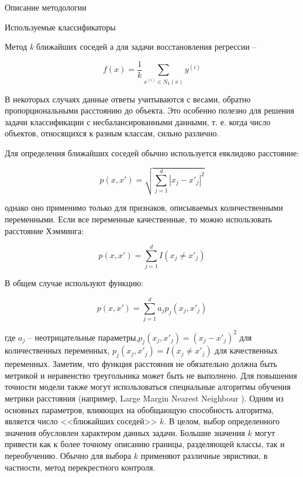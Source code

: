 \begin{section}{Описание методологии}
\begin{subsection}{Используемые классификаторы}
\begin{subsubsection}{Метод \textit{k} ближайших соседей}
      а для задачи восстановления регрессии –

      \begin{equation}
      f(x)=\frac{1}{k} \sum_{x^{(i)} \in N_k(x)}y^{(i)}
     \end{equation}

     В некоторых случаях данные ответы учитываются с весами, обратно пропорциональными расстоянию до объекта. Это особенно полезно для решения задачи классификации с несбалансированными данными, т. е. когда число объектов, относящихся к разным классам, сильно различно.

Для определения ближайших соседей обычно используется евклидово расстояние:

    \begin{equation}
      p(x,x') = \sqrt{\sum\limits_{j=1}^d |x_j - x'_j|^2}
    \end{equation}


    однако оно применимо только для признаков, описываемых количественными переменными. Если все переменные качественные, то можно использовать расстояние Хэмминга:

    \begin{equation}
      p(x,x') = \sum\limits_{j=1}^d I(x_j \neq x'_j)
    \end{equation}

    В общем случае используют функцию:

\begin{equation}
  p(x,x')=\sum\limits_{j=1}^d a_j p_j (x_j,x'_j)
\end{equation}

    где $a_j$ – неотрицательные параметры,$p_j(x_j,x'_j)=(x_j-x'_j)^2$  для количественных переменных, $p_j(x_j,x'_j)=I(x_j \neq x'_j)$  для качественных переменных. Заметим, что функция расстояния не обязательно должна быть метрикой и неравенство треугольника может быть не выполнено.
Для повышения точности модели также могут использоваться специальные алгоритмы обучения метрики расстояния (например, Large Margin Nearest Neighbour \cite{Weinberger}).
Одним из основных параметров, влияющих на обобщающую способность алгоритма, является число <<ближайших соседей>>  $k$. В целом, выбор определенного значения обусловлен характером данных задачи. Большие значения $k$ могут привести как к более точному описанию границы, разделяющей классы, так и переобучению. Обычно для выбора $k$ применяют различные эвристики, в частности, метод перекрестного контроля.

    \end{subsubsection}


\end{subsection}
\end{section}
